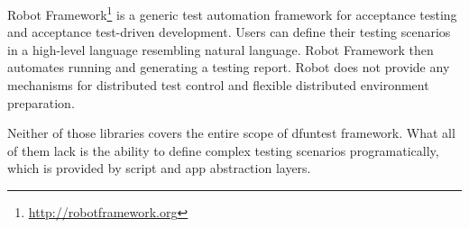 Robot Framework\footnote{\url{http://robotframework.org}} is a generic test
automation framework for acceptance testing and acceptance test-driven
development.
Users can define their testing scenarios in a high-level language resembling natural language.
Robot Framework then automates running and generating a testing report.
Robot does not provide any mechanisms for distributed test control and flexible distributed environment preparation.

Neither of those libraries covers the entire scope of dfuntest framework. What
all of them lack is the ability to define complex testing scenarios
programatically, which is provided by script and app abstraction layers.
